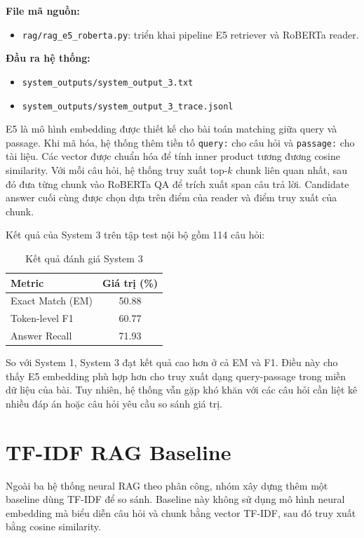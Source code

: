 \documentclass[12pt,a4paper]{report}
\begin{document}
\textbf{File mã nguồn:}
\begin{itemize}
    \item \texttt{rag/rag\_e5\_roberta.py}: triển khai pipeline E5 retriever và RoBERTa reader.
\end{itemize}

\textbf{Đầu ra hệ thống:}
\begin{itemize}
    \item \texttt{system\_outputs/system\_output\_3.txt}
    \item \texttt{system\_outputs/system\_output\_3\_trace.jsonl}
\end{itemize}

E5 là mô hình embedding được thiết kế cho bài toán matching giữa query và passage. Khi mã hóa, hệ thống thêm tiền tố \texttt{query:} cho câu hỏi và \texttt{passage:} cho tài liệu. Các vector được chuẩn hóa để tính inner product tương đương cosine similarity. Với mỗi câu hỏi, hệ thống truy xuất top-\(k\) chunk liên quan nhất, sau đó đưa từng chunk vào RoBERTa QA để trích xuất span câu trả lời. Candidate answer cuối cùng được chọn dựa trên điểm của reader và điểm truy xuất của chunk.

Kết quả của System 3 trên tập test nội bộ gồm 114 câu hỏi:

\begin{table}[H]
\centering
\caption{Kết quả đánh giá System 3}
\begin{tabular}{|l|c|}
\hline
\textbf{Metric} & \textbf{Giá trị (\%)} \\
\hline
Exact Match (EM) & 50.88 \\
\hline
Token-level F1 & 60.77 \\
\hline
Answer Recall & 71.93 \\
\hline
\end{tabular}
\end{table}

So với System 1, System 3 đạt kết quả cao hơn ở cả EM và F1. Điều này cho thấy E5 embedding phù hợp hơn cho truy xuất dạng query-passage trong miền dữ liệu của bài. Tuy nhiên, hệ thống vẫn gặp khó khăn với các câu hỏi cần liệt kê nhiều đáp án hoặc câu hỏi yêu cầu so sánh giá trị.

\section{TF-IDF RAG Baseline}

Ngoài ba hệ thống neural RAG theo phân công, nhóm xây dựng thêm một baseline dùng TF-IDF để so sánh. Baseline này không sử dụng mô hình neural embedding mà biểu diễn câu hỏi và chunk bằng vector TF-IDF, sau đó truy xuất bằng cosine similarity.
\end{document}
